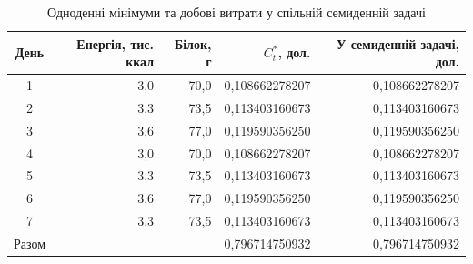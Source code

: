 \begin{table}[htbp]
\centering\small
\caption{Одноденні мінімуми та добові витрати у спільній семиденній задачі}
\label{tab:glpk-multiday-days}
\begin{tabular}{crrrr}
\toprule
День & Енергія, тис. ккал & Білок, г & $C_t^*$, дол. & У семиденній задачі, дол. \\
\midrule
1 & 3{,}0 & 70{,}0 & 0{,}108662278207 & 0{,}108662278207 \\
2 & 3{,}3 & 73{,}5 & 0{,}113403160673 & 0{,}113403160673 \\
3 & 3{,}6 & 77{,}0 & 0{,}119590356250 & 0{,}119590356250 \\
4 & 3{,}0 & 70{,}0 & 0{,}108662278207 & 0{,}108662278207 \\
5 & 3{,}3 & 73{,}5 & 0{,}113403160673 & 0{,}113403160673 \\
6 & 3{,}6 & 77{,}0 & 0{,}119590356250 & 0{,}119590356250 \\
7 & 3{,}3 & 73{,}5 & 0{,}113403160673 & 0{,}113403160673 \\
\midrule
Разом & & & 0{,}796714750932 & 0{,}796714750932 \\
\bottomrule
\end{tabular}
\end{table}
